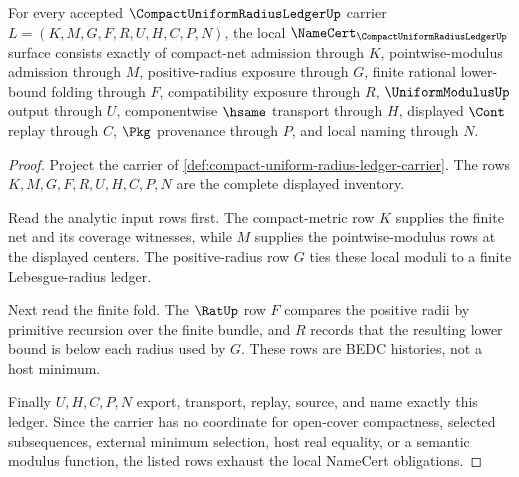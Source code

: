 \begin{theorem}
\label{thm:compact-uniform-radius-ledger-namecert-obligations}
For every accepted $\CompactUniformRadiusLedgerUp$ carrier $L=(K,M,G,F,R,U,H,C,P,N)$, the local $\NameCert_{\CompactUniformRadiusLedgerUp}$ surface consists exactly of compact-net admission through $K$, pointwise-modulus admission through $M$, positive-radius exposure through $G$, finite rational lower-bound folding through $F$, compatibility exposure through $R$, $\UniformModulusUp$ output through $U$, componentwise $\hsame$ transport through $H$, displayed $\Cont$ replay through $C$, $\Pkg$ provenance through $P$, and local naming through $N$.
\end{theorem}
\begin{proof}
Project the carrier of \autoref{def:compact-uniform-radius-ledger-carrier}. The rows $K,M,G,F,R,U,H,C,P,N$ are the complete displayed inventory.

Read the analytic input rows first. The compact-metric row $K$ supplies the finite net and its coverage witnesses, while $M$ supplies the pointwise-modulus rows at the displayed centers. The positive-radius row $G$ ties these local moduli to a finite Lebesgue-radius ledger.

Next read the finite fold. The $\RatUp$ row $F$ compares the positive radii by primitive recursion over the finite bundle, and $R$ records that the resulting lower bound is below each radius used by $G$. These rows are BEDC histories, not a host minimum.

Finally $U,H,C,P,N$ export, transport, replay, source, and name exactly this ledger. Since the carrier has no coordinate for open-cover compactness, selected subsequences, external minimum selection, host real equality, or a semantic modulus function, the listed rows exhaust the local NameCert obligations.
\end{proof}

